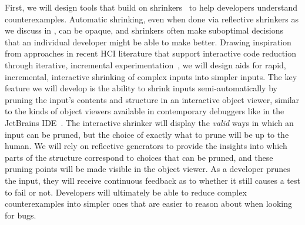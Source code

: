 First, we will design tools that build on
shrinkers~\cite{hughes_quickcheck_2007,arts_shrinking_2014} to help developers
understand counterexamples. Automatic shrinking, even when done via reflective
shrinkers as we discuss in , can be opaque, and
shrinkers often make suboptimal decisions that an individual developer might be
able to make better.
Drawing inspiration from approaches in recent HCI literature that support
interactive code reduction through iterative, incremental
experimentation~\cite{ref:lim2018ply,ref:head2018interactive,ref:holmes2012systematizing,ref:hibschman2016telescope},
we will design aids for rapid, incremental, interactive shrinking of complex
inputs into simpler inputs. The key feature we will develop is the ability to
shrink inputs semi-automatically by pruning the input's contents and structure in an interactive
object viewer, similar to the kinds of object viewers available in contemporary
debuggers like in the JetBrains IDE~\cite{tool:jetbrains}.
The interactive shrinker will display the \emph{valid} ways
in which an input can be pruned, but the choice of exactly what to prune will be
up to the human. We will rely on reflective generators to provide the insights
into which parts of the structure correspond to choices that can be pruned, and
these pruning points will be made
visible in the object viewer. As a developer prunes the input, they will receive
continuous feedback as to whether it still causes a test to fail or not.
Developers will ultimately be able to
reduce complex counterexamples into simpler ones that are
easier to reason about when looking for bugs.





